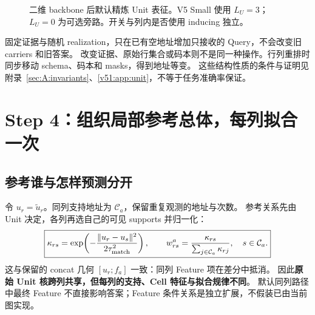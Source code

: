 \documentclass[11pt,UTF8,fontset=fandol]{ctexart}
\numberwithin{equation}{section}
\theoremstyle{definition}
\begin{document}
\begin{figure}[htbp]\centering
{}
\caption{二维 backbone 后默认精炼 Unit 表征。V5 Small 使用 $L_U=3$；$L_U=0$ 为可选旁路。开关与列内是否使用 inducing 独立。}
\label{fig:backbone}\label{v51:fig:unit-option}\end{figure}



固定证据与随机 realization，只在已有空地址增加只接收的 Query，不会改变旧 carriers 和旧答案。
改变证据、原始行集合或码本则不是同一种操作。行列重排时同步移动 schema、码本和 masks，得到地址等变。
这些结构性质的条件与证明见附录~\ref{sec:A:invariants}、\ref{v51:app:unit}，不等于任务准确率保证。

\section{Step 4：组织局部参考总体，每列拟合一次}
\label{front:sec:step4}\label{sec:R:response}
\subsection{参考谁与怎样预测分开}
令 $u_r=\widetilde u_r$。同列支持地址为 $\mathcal C_a$，保留重复观测的地址与次数。
参考关系先由 Unit 决定，各列再选自己的可见 supports 并归一化：
\begin{equation}
 \boxed{\kappa_{rs}=\exp\!\left(-\frac{\|u_r-u_s\|^2}{2\tau_{\rm match}^2}\right),\qquad
 w_{rs}^a=\frac{\kappa_{rs}}{\sum_{j\in\mathcal C_a}\kappa_{rj}},\quad s\in\mathcal C_a.}
 \label{v53:eq:kernel}
\end{equation}
这与保留的 concat 几何 $[u_r;f_a]$ 一致：同列 Feature 项在差分中抵消。
因此\textbf{原始 Unit 核跨列共享，但每列的支持、Cell 特征与拟合规律不同}。
默认同列路径中最终 Feature 不直接影响答案；Feature 条件关系是独立扩展，不假装已由当前图实现。
\end{document}
